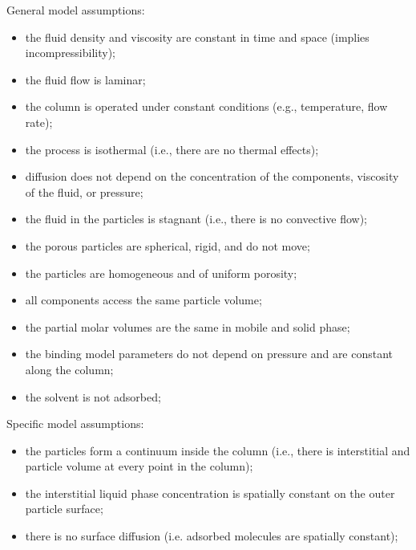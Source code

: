 \documentclass{article}
\begin{document}
General model assumptions:
\begin{itemize}
    \item the fluid density and viscosity are constant in time and space (implies incompressibility);
    \item the fluid flow is laminar;
    \item the column is operated under constant conditions (e.g., temperature, flow rate);
    \item the process is isothermal (i.e., there are no thermal effects);
    \item diffusion does not depend on the concentration of the components, viscosity of the fluid, or pressure;
    \item the fluid in the particles is stagnant (i.e., there is no convective flow);
    \item the porous particles are spherical, rigid, and do not move;
    \item the particles are homogeneous and of uniform porosity;
    \item all components access the same particle volume;
    \item the partial molar volumes are the same in mobile and solid phase;
    \item the binding model parameters do not depend on pressure and are constant along the column;
    \item the solvent is not adsorbed;
\end{itemize}

Specific model assumptions:
\begin{itemize}
    \item the particles form a continuum inside the column (i.e., there is interstitial and particle volume at every point in the column);
    \item the interstitial liquid phase concentration is spatially constant on the outer particle surface;
    \item there is no surface diffusion (i.e. adsorbed molecules are spatially constant);
\end{itemize}
\end{document}
